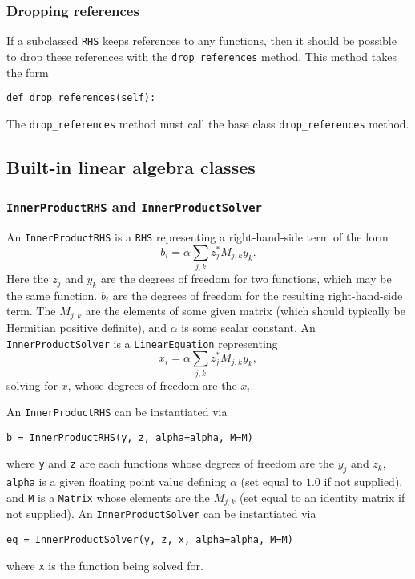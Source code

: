 \documentclass[11pt]{article}
\begin{document}
\subsubsection{Dropping references}

If a subclassed \texttt{RHS} keeps references to any functions, then it should
be possible to drop these references with the \texttt{drop\_references} method.
This method takes the form
\begin{lstlisting}
def drop_references(self):
\end{lstlisting}
The \texttt{drop\_references} method must call the base class
\texttt{drop\_references} method.

\subsection{Built-in linear algebra classes}

\subsubsection{\texttt{InnerProductRHS} and \texttt{InnerProductSolver}}

An \texttt{InnerProductRHS} is a \texttt{RHS} representing a right-hand-side
term of the form
\begin{equation*}
  b_i = \alpha \sum_{j,k} z_j^* M_{j,k} y_k.
\end{equation*}
Here the $z_j$ and $y_k$ are the degrees of freedom for two functions, which
may be the same function. $b_i$ are the degrees of freedom for the resulting
right-hand-side term. The $M_{j,k}$ are the elements of some given matrix
(which should typically be Hermitian positive definite), and $\alpha$ is some
scalar constant. An \texttt{InnerProductSolver} is a \texttt{LinearEquation}
representing
\begin{equation*}
  x_i = \alpha \sum_{j,k} z_j^* M_{j,k} y_k,
\end{equation*}
solving for $x$, whose degrees of freedom are the $x_i$.

An \texttt{InnerProductRHS} can be instantiated via
\begin{lstlisting}
b = InnerProductRHS(y, z, alpha=alpha, M=M)
\end{lstlisting}
where \texttt{y} and \texttt{z} are each functions whose degrees of freedom are
the $y_j$ and $z_k$, \texttt{alpha} is a given floating point value defining
$\alpha$ (set equal to $1.0$ if not supplied), and \texttt{M} is a
\texttt{Matrix} whose elements are the $M_{j,k}$ (set equal to an identity
matrix if not supplied). An \texttt{InnerProductSolver} can be instantiated via
\begin{lstlisting}
eq = InnerProductSolver(y, z, x, alpha=alpha, M=M)
\end{lstlisting}
where \texttt{x} is the function being solved for.
\end{document}
